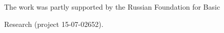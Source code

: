 


\vspace*{-14pt}



\Ack



\vspace*{-3pt}



\noindent

The work was partly supported by the Russian Foundation for Basic

Research (project 15-07-02652).





\renewcommand{\bibname}{\protect\rmfamily References}




\vspace*{-6pt}




